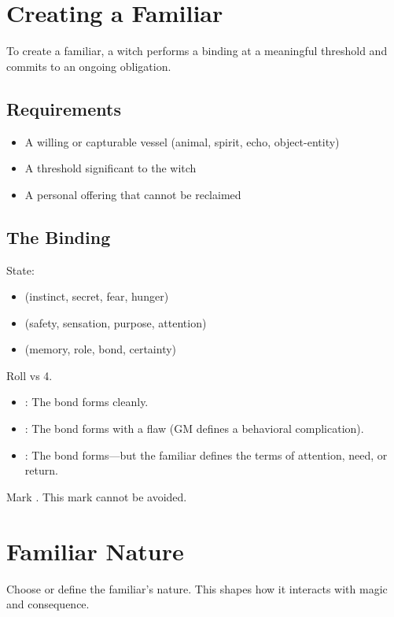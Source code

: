 \section{Creating a Familiar}
To create a familiar, a witch performs a binding at a meaningful threshold and commits to an ongoing obligation.

\subsection{Requirements}
\begin{itemize}
  \item A willing or capturable vessel (animal, spirit, echo, object-entity)
  \item A threshold significant to the witch
  \item A personal offering that cannot be reclaimed
\end{itemize}

\subsection{The Binding}
State:
\begin{itemize}
  \item {} (instinct, secret, fear, hunger)
  \item {} (safety, sensation, purpose, attention)
  \item {} (memory, role, bond, certainty)
\end{itemize}

Roll  vs \DV{} 4.

\begin{itemize}
  \item {}: The bond forms cleanly.
  \item {}: The bond forms with a flaw (GM defines a behavioral complication).
  \item {}: The bond forms---but the familiar defines the terms of attention, need, or return.
\end{itemize}

Mark . This mark cannot be avoided.

\section{Familiar Nature}
Choose or define the familiar's nature. This shapes how it interacts with magic and consequence.

